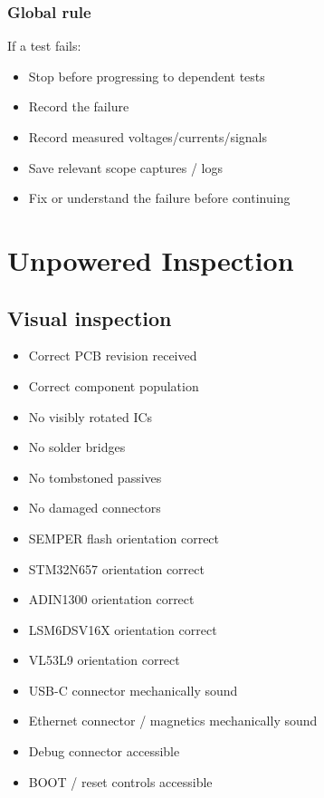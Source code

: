 \documentclass[10pt,a4paper,oneside]{report}
\providecommand{\tightlist}{\setlength{\itemsep}{1pt}\setlength{\parskip}{1pt}}
\begin{document}
\subsubsection{Global rule}\label{wiki-hardware-bring-up-and-testing--global-rule}

If a test fails:

\begin{itemize}
\tightlist
\item[$\square$]
  Stop before progressing to dependent tests
\item[$\square$]
  Record the failure
\item[$\square$]
  Record measured voltages/currents/signals
\item[$\square$]
  Save relevant scope captures / logs
\item[$\square$]
  Fix or understand the failure before continuing
\end{itemize}

\section{Unpowered Inspection}\label{wiki-hardware-bring-up-and-testing--1-unpowered-inspection}

\subsection{Visual inspection}\label{wiki-hardware-bring-up-and-testing--11-visual-inspection}

\begin{itemize}
\tightlist
\item[$\square$]
  Correct PCB revision received
\item[$\square$]
  Correct component population
\item[$\square$]
  No visibly rotated ICs
\item[$\square$]
  No solder bridges
\item[$\square$]
  No tombstoned passives
\item[$\square$]
  No damaged connectors
\item[$\square$]
  SEMPER flash orientation correct
\item[$\square$]
  STM32N657 orientation correct
\item[$\square$]
  ADIN1300 orientation correct
\item[$\square$]
  LSM6DSV16X orientation correct
\item[$\square$]
  VL53L9 orientation correct
\item[$\square$]
  USB-C connector mechanically sound
\item[$\square$]
  Ethernet connector / magnetics mechanically sound
\item[$\square$]
  Debug connector accessible
\item[$\square$]
  BOOT / reset controls accessible
\end{itemize}
\end{document}
